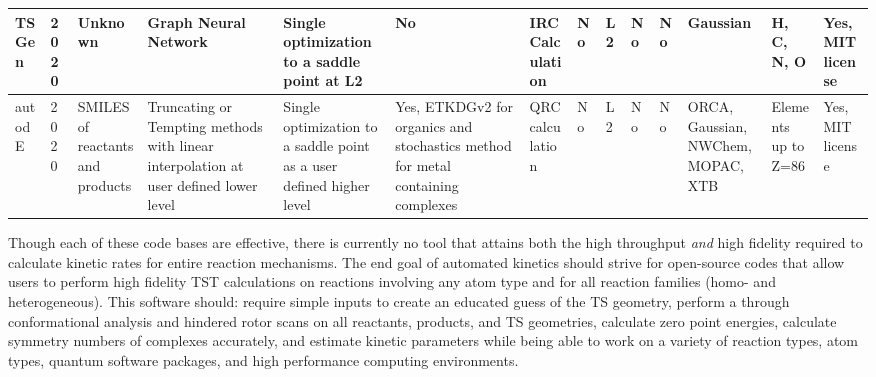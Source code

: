 \documentclass[preprint, 11pt]{elsarticle} %
\begin{document}
\begin{landscape}
\begin{singlespace}
\begin{footnotesize}
\begin{longtable}{| p{0.5in} | p{0.25in} | p{0.6in} | p{1.0in} | p{0.6in}| p{0.45in}| p{0.5in }| p{0.3in}| p{0.2in}| p{0.5in}| p{0.45in}| p{0.5in}| p{0.5in} | p{0.45in} |}
\\
\hline
TS Gen & 2020 & Unknown & Graph Neural Network & Single optimization to a saddle point at L2 & No & IRC Calculation & No & L2 & No & No & Gaussian & H, C, N, O & Yes, MIT license 
\\
\hline 
autodE & 2020 & SMILES of reactants and products & Truncating or Tempting methods with linear interpolation at user defined lower level & Single optimization to a saddle point as a user defined higher level & Yes, ETKDGv2 for organics and stochastics method for metal containing complexes & QRC calculation & No & L2 & No & No & ORCA, Gaussian, NWChem, MOPAC, XTB & Elements up to Z=86 & Yes, MIT license \\
\hline

\end{longtable}
\end{footnotesize}
\end{singlespace}
\end{landscape}

Though each of these code bases are effective, there is currently no tool that attains both the high throughput \textit{and} high fidelity required to calculate kinetic rates for entire reaction mechanisms.
The end goal of automated kinetics should strive for open-source codes that allow users to perform high fidelity TST calculations on reactions involving any atom type and for all reaction families (homo- and heterogeneous).
This software should: require simple inputs to create an educated guess of the TS geometry, perform a through conformational analysis and hindered rotor scans on all reactants, products, and TS geometries, calculate zero point energies, calculate symmetry numbers of complexes accurately, and estimate kinetic parameters while being able to work on a variety of reaction types, atom types, quantum software packages, and high performance computing environments.
\end{document}
